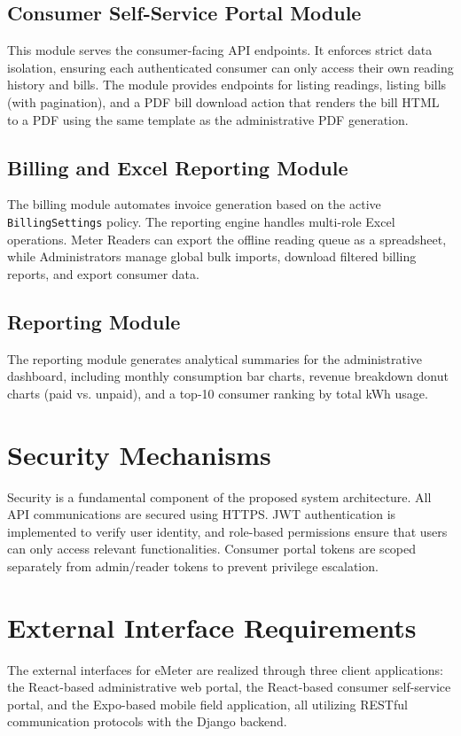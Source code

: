 \documentclass[12pt, a4paper, onecolumn]{report}
\begin{document}
\subsection{Consumer Self-Service Portal Module}
This module serves the consumer-facing API endpoints. It enforces strict data isolation, ensuring each authenticated consumer can only access their own reading history and bills. The module provides endpoints for listing readings, listing bills (with pagination), and a PDF bill download action that renders the bill HTML to a PDF using the same template as the administrative PDF generation.

\subsection{Billing and Excel Reporting Module}
The billing module automates invoice generation based on the active \texttt{BillingSettings} policy. The reporting engine handles multi-role Excel operations. Meter Readers can export the offline reading queue as a spreadsheet, while Administrators manage global bulk imports, download filtered billing reports, and export consumer data.

\subsection{Reporting Module}
The reporting module generates analytical summaries for the administrative dashboard, including monthly consumption bar charts, revenue breakdown donut charts (paid vs. unpaid), and a top-10 consumer ranking by total kWh usage.

\section{Security Mechanisms}
Security is a fundamental component of the proposed system architecture. All API communications are secured using HTTPS. JWT authentication is implemented to verify user identity, and role-based permissions ensure that users can only access relevant functionalities. Consumer portal tokens are scoped separately from admin/reader tokens to prevent privilege escalation.

\section{External Interface Requirements}
The external interfaces for eMeter are realized through three client applications: the React-based administrative web portal, the React-based consumer self-service portal, and the Expo-based mobile field application, all utilizing RESTful communication protocols with the Django backend.
\end{document}
